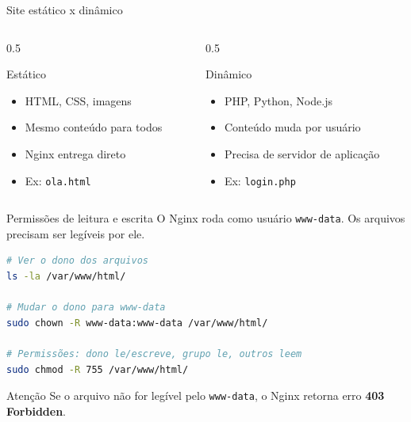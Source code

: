 \documentclass{if-beamer}
\begin{document}
        \begin{frame}{Site estático x dinâmico}
    \begin{columns}
        \begin{column}{0.5\textwidth}
            \begin{block}{Estático}
                \begin{itemize}
                    \item HTML, CSS, imagens
                    \item Mesmo conteúdo para todos
                    \item Nginx entrega direto
                    \item Ex: \texttt{ola.html}
                \end{itemize}
            \end{block}
        \end{column}
        \begin{column}{0.5\textwidth}
            \begin{block}{Dinâmico}
                \begin{itemize}
                    \item PHP, Python, Node.js
                    \item Conteúdo muda por usuário
                    \item Precisa de servidor de aplicação
                    \item Ex: \texttt{login.php}
                \end{itemize}
            \end{block}
        \end{column}
    \end{columns}
   
\end{frame}

        \begin{frame}[fragile]{Permissões de leitura e escrita}
    O Nginx roda como usuário \texttt{www-data}. Os arquivos precisam ser legíveis por ele.
    
    
    \begin{lstlisting}[language=bash]
# Ver o dono dos arquivos
ls -la /var/www/html/

# Mudar o dono para www-data
sudo chown -R www-data:www-data /var/www/html/

# Permissões: dono le/escreve, grupo le, outros leem
sudo chmod -R 755 /var/www/html/
    \end{lstlisting}
    
  
\end{frame}
 \begin{frame}
   \begin{alertblock}{Atenção}
        Se o arquivo não for legível pelo \texttt{www-data}, o Nginx retorna erro \textbf{403 Forbidden}.
    \end{alertblock}
 \end{frame}
		
\end{document}
